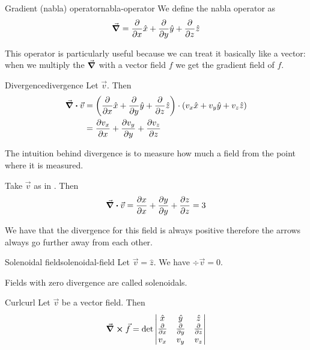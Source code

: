 \documentclass[12pt]{extarticle}
\begin{document}
\begin{definition}{Gradient (nabla) operator}{nabla-operator}
    We define the nabla operator as
    \begin{equation}
        \grad = \pdv{}{x} \hat{x} + \pdv{}{y} \hat{y} + \pdv{}{z} \hat{z}
    \end{equation}
\end{definition}

This operator is particularly useful because we can treat it basically like a vector: when we multiply the $\grad$ with a vector field $f$ we get the gradient field of $f$.

\begin{definition}{Divergence}{divergence}
    Let $\vec v$. Then
    \begin{align}
        \div \vec v & = \left( \pdv{}{x} \hat{x} + \pdv{}{y} \hat{y} + \pdv{}{z} \hat{z} \right) \cdot \left( v_x \hat x + v_y \hat y + v_z \hat z\right) \\
                    & = \pdv{v_x}{x} + \pdv{v_y}{y} + \pdv{v_z}{z}
    \end{align}
\end{definition}

The intuition behind divergence is to measure how much a field  from the point where it is measured.

\begin{example}{}{}
    Take $\vec v$ as in . Then
    \begin{equation}
        \div \vec v = \pdv{x}{x} + \pdv{y}{y} + \pdv{z}{z} = 3
    \end{equation}

    We have that the divergence for this field is always positive therefore the arrows always go further away from each other.
\end{example}

\begin{example}{Solenoidal field}{solenoidal-field}
    Let $\vec v = \hat z$. We have $\div \vec v = 0$.

    Fields with zero divergence are called solenoidals.
\end{example}

\begin{definition}{Curl}{curl}
    Let $\vec v$ be a vector field. Then
    \begin{equation}
        \curl \vec f = \det\begin{vmatrix}
            \hat x    & \hat y    & \hat z    \\
            \pdv{}{x} & \pdv{}{y} & \pdv{}{z} \\
            v_x       & v_y       & v_z
        \end{vmatrix}
    \end{equation}
\end{definition}
\end{document}
